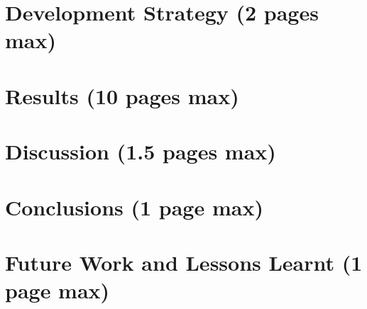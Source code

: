 \documentclass[journal=jacsat,manuscript=article]{achemso}
\begin{document}
\hypertarget{development-strategy-2-pages-max}{%
\section{Development Strategy (2 pages
max)}\label{development-strategy-2-pages-max}}

\hypertarget{results-10-pages-max}{%
\section{Results (10 pages max)}\label{results-10-pages-max}}

\hypertarget{discussion-1.5-pages-max}{%
\section{Discussion (1.5 pages max)}\label{discussion-1.5-pages-max}}

\hypertarget{conclusions-1-page-max}{%
\section{Conclusions (1 page max)}\label{conclusions-1-page-max}}

\hypertarget{future-work-and-lessons-learnt-1-page-max}{%
\section{Future Work and Lessons Learnt (1 page
max)}\label{future-work-and-lessons-learnt-1-page-max}}




\end{document}
